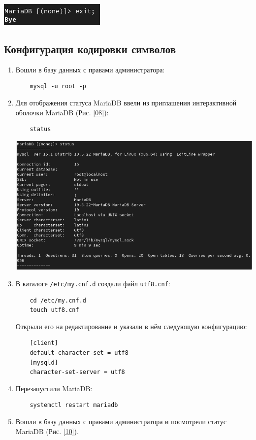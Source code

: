 \begin{center}
    \centering
    \includegraphics[width=\textwidth]{../images/image07.png}
   \label{07}
\end{center}

\subsection{Конфигурация кодировки символов}
\begin{enumerate}
\item Вошли в базу данных с правами администратора:
  \begin{verbatim}
    mysql -u root -p
  \end{verbatim}
\item Для отображения статуса MariaDB ввели из приглашения интерактивной оболочки MariaDB (Рис. \ref{08}):
  \begin{verbatim}
    status
  \end{verbatim}

\begin{center}
    \centering
    \includegraphics[width=\textwidth]{../images/image08.png}
    \label{08}
\end{center}

\item В каталоге \texttt{/etc/my.cnf.d} создали файл \texttt{utf8.cnf}:
  \begin{verbatim}
    cd /etc/my.cnf.d
    touch utf8.cnf
  \end{verbatim}
  Открыли его на редактирование и указали в нём следующую конфигурацию:
  \begin{verbatim}
    [client]
    default-character-set = utf8
    [mysqld]
    character-set-server = utf8
  \end{verbatim}
\item Перезапустили MariaDB:
  \begin{verbatim}
    systemctl restart mariadb
  \end{verbatim}
\item Вошли в базу данных с правами администратора и посмотрели статус MariaDB (Рис. \ref{10}).


\end{enumerate}
